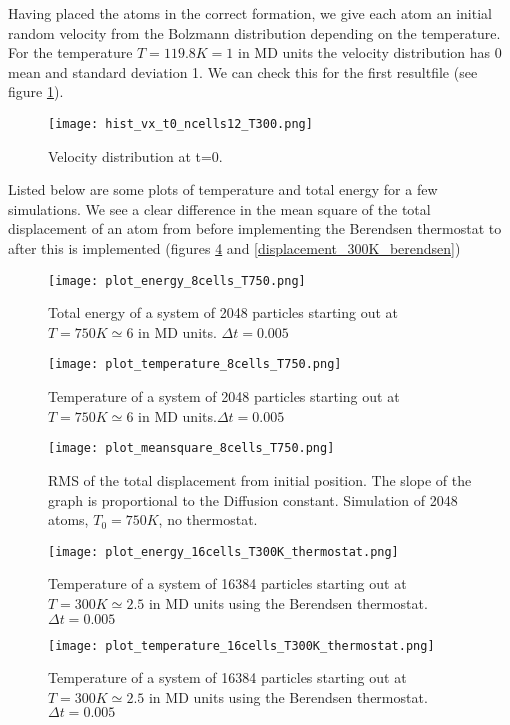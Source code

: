 \documentclass[a4paper,english, 10pt, twoside]{article}
\begin{document}
Having placed the atoms in the correct formation, we give each atom an initial random velocity 
from the Bolzmann distribution depending on the temperature. \\
For the temperature $T = 119.8K = 1$ in MD units the velocity distribution has 0 mean and 
standard deviation 1. We can check this for the first resultfile (see figure \ref{distribution_vx_t0}).
\begin{figure}[H]
\centering
\texttt{[image: hist\_vx\_t0\_ncells12\_T300.png]}
\caption{Velocity distribution at t=0.}
\label{distribution_vx_t0}
\end{figure}
Listed below are some plots of temperature and total energy for a few simulations. We see a clear 
difference in the mean square of the total displacement of an atom from before implementing the 
Berendsen thermostat to after this is implemented (figures \ref{displacement_750K} and 
\ref{displacement_300K_berendsen})

\begin{figure}[H]
\centering
\texttt{[image: plot\_energy\_8cells\_T750.png]}
\caption{Total energy of a system of 2048 particles starting out at $T=750K \simeq 6$ in MD 
units. $\Delta t = 0.005$}
\label{energy_750K}
\end{figure}

\begin{figure}[H]
\centering
\texttt{[image: plot\_temperature\_8cells\_T750.png]}
\caption{Temperature of a system of 2048 particles starting out at $T=750K \simeq 6$ in MD 
units.$\Delta t = 0.005$}
\label{temperature_750K}
\end{figure}

\begin{figure}[H]
\centering
\texttt{[image: plot\_meansquare\_8cells\_T750.png]}
\caption{RMS of the total displacement from initial position. The slope of the graph 
is proportional to the Diffusion constant. Simulation of 2048 atoms, $T_0=750K$, no thermostat.}
\label{displacement_750K}
\end{figure}

\begin{figure}[H]
\centering
\texttt{[image: plot\_energy\_16cells\_T300K\_thermostat.png]}
\caption{Temperature of a system of 16384 particles starting out at $T=300K \simeq 2.5$ in 
MD units using the Berendsen thermostat. $\Delta t = 0.005$}
\label{energy_300K_berendsen}
\end{figure}

\begin{figure}[H]
\centering
\texttt{[image: plot\_temperature\_16cells\_T300K\_thermostat.png]}
\caption{Temperature of a system of 16384 particles starting out at $T=300K \simeq 2.5$ in MD units using the Berendsen thermostat. $\Delta t = 0.005$}
\label{temperature_300K_berendsen}
\end{figure}
\end{document}
